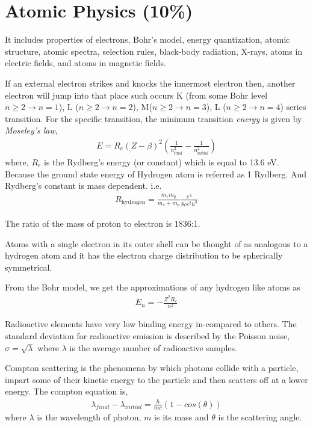 
\section{Atomic Physics (10\%)}

It includes properties of electrons, Bohr's model, energy quantization, atomic structure, atomic spectra, selection rules, black-body radiation, X-rays, atoms in electric fields, and atoms in magnetic fields.

If an external electron strikes and knocks the innermost electron then, another electron will jump into that place such occurs K (from some Bohr level $n \geq 2 \to n = 1$), L ($n \geq 2 \to n = 2$), M($n \geq 2 \to n = 3$), L ($n \geq 2 \to n = 4$) series transition. For the specific transition, the minimum transition \emph{energy} is given by \emph{Moseley's law},
\begin{align}
E = R_{e} (Z - \beta)^{2} \left( \frac{1}{n_{\text{final}}^{2}} - \frac{1}{n_{\text{initial}}^{2}} \right)
\end{align}
where, $R_{e}$ is the Rydberg's energy (or constant) which is equal to 13.6 eV. Because the ground state energy of Hydrogen atom is referred as 1 Rydberg. And Rydberg's constant is mass dependent. i.e.
\begin{align*}
R_{\text{hydrogen}} = \frac{m_{e} m_{p}}{m_{e} + m_{p}} \frac{e^{4}}{8c\epsilon^{2} h^{3}}
\end{align*}

The ratio of the mass of proton to electron is 1836:1.

Atoms with a single electron in its outer shell can be thought of as analogous to a hydrogen atom and it has the electron charge distribution to be spherically symmetrical.

From the Bohr model, we get the approximations of any hydrogen like atoms as 
\begin{align*}
E_{n} = -\frac{Z^{2}R_{e}}{n^{2}}
\end{align*}

Radioactive elements have very low binding energy in-compared to others. The standard deviation for radioactive emission is described by the Poisson noise, $\sigma = \sqrt{\lambda}$ where $\lambda$ is the average number of radioactive samples. 

Compton scattering is the phenomena by which photons collide with a particle, impart some of their kinetic energy to the particle and then scatters off at a lower energy. The compton equation is,
\begin{align}
\lambda_{final} - \lambda_{initial} = \frac{h}{m c}(1 - cos(\theta))
\end{align}
where $\lambda$ is the wavelength of photon, $m$ is its mass and $\theta$ is the scattering angle.

